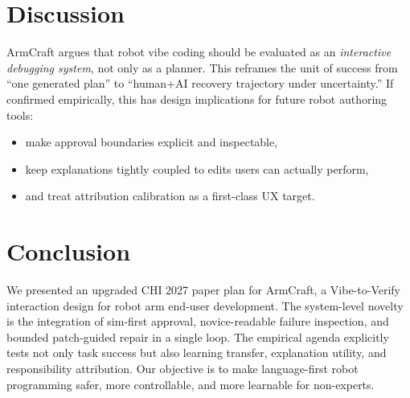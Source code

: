 \documentclass[sigconf,review,anonymous]{acmart}
\begin{document}
\section{Discussion}
ArmCraft argues that robot vibe coding should be evaluated as an \emph{interactive debugging system}, not only as a planner. This reframes the unit of success from ``one generated plan'' to ``human+AI recovery trajectory under uncertainty.'' If confirmed empirically, this has design implications for future robot authoring tools:
\begin{itemize}
  \item make approval boundaries explicit and inspectable,
  \item keep explanations tightly coupled to edits users can actually perform,
  \item and treat attribution calibration as a first-class UX target.
\end{itemize}

\section{Conclusion}
We presented an upgraded CHI 2027 paper plan for ArmCraft, a Vibe-to-Verify interaction design for robot arm end-user development. The system-level novelty is the integration of sim-first approval, novice-readable failure inspection, and bounded patch-guided repair in a single loop. The empirical agenda explicitly tests not only task success but also learning transfer, explanation utility, and responsibility attribution. Our objective is to make language-first robot programming safer, more controllable, and more learnable for non-experts.



\end{document}
